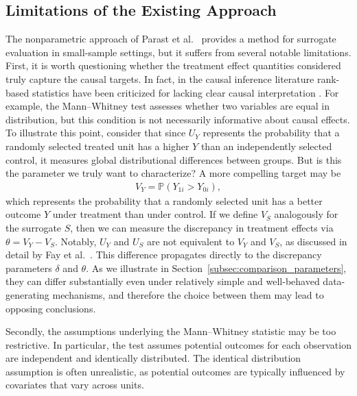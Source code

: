 \documentclass[12pt]{article}
\newcommand{\Prob}{\mathbb{P}}
\begin{document}
\subsection{Limitations of the Existing Approach}\label{subsec:limitations}

The nonparametric approach of Parast et al.\ \citep{parast2024rank} provides a method for surrogate evaluation in small-sample settings, but it suffers from several notable limitations. First, it is worth questioning whether the treatment effect quantities considered truly capture the causal targets. In fact, in the causal inference literature rank-based statistics have been criticized for lacking clear causal interpretation \citep{imbens2015causal}. For example, the Mann--Whitney test assesses whether two variables are equal in distribution, but this condition is not necessarily informative about causal effects. To illustrate this point, consider that since \(U_{Y}\) represents the probability that a randomly selected treated unit has a higher \(Y\) than an independently selected control, it measures global distributional differences between groups. But is this the parameter we truly want to characterize? A more compelling target may be
\begin{align}
  V_{Y} = \Prob(Y_{1i} > Y_{0i}),
\end{align}
which represents the probability that a randomly selected unit has a better outcome \(Y\) under treatment than under control. If we define \(V_{S}\) analogously for the surrogate \(S\), then we can measure the discrepancy in treatment effects via \(\theta = V_{Y} - V_{S}\). Notably, \(U_{Y}\) and \(U_{S}\) are not equivalent to \(V_{Y}\) and \(V_{S}\), as discussed in detail by Fay et al.\ \citep{fay2018causal}. This difference propagates directly to the discrepancy parameters \(\delta\) and \(\theta\). As we illustrate in Section~\ref{subsec:comparison_parameters}, they can differ substantially even under relatively simple and well-behaved data-generating mechanisms, and therefore the choice between them may lead to opposing conclusions.

Secondly, the assumptions underlying the Mann--Whitney statistic may be too restrictive. In particular, the test assumes potential outcomes for each observation are independent and identically distributed. The identical distribution assumption is often unrealistic, as potential outcomes are typically influenced by covariates that vary across units.
\end{document}
